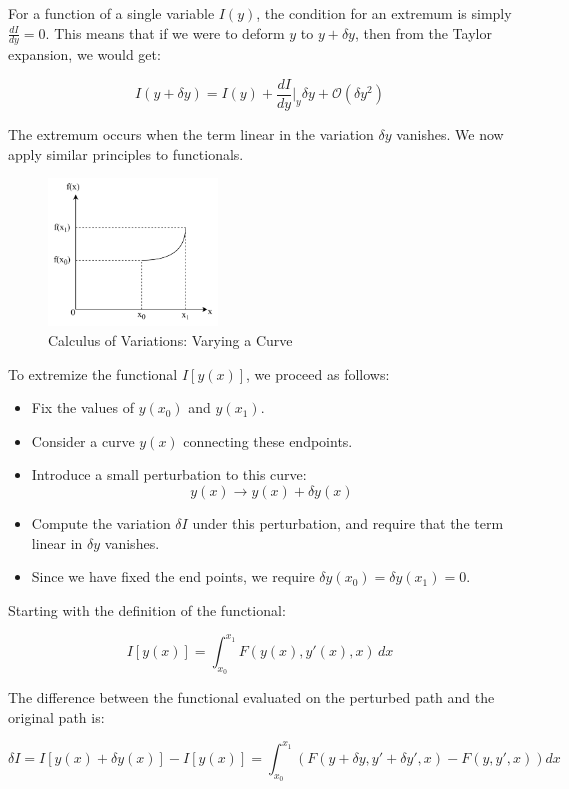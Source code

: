 For a function of a single variable $I(y)$, the condition for an extremum is simply 
$\frac{dI}{dy} = 0$. This means that if we were to deform $y$ to $y + \delta y$, then 
from the Taylor expansion, we would get:

\[
    I(y + \delta y) = I(y) + \frac{dI}{dy}\bigg|_y \delta y + \mathcal{O}(\delta y^2)
\]

The extremum occurs when the term linear in the variation $\delta y$ vanishes. We now 
apply similar principles to functionals.

\begin{figure}[ht]
    \centering
    \includegraphics[width=0.4\textwidth]{images/3-1-1.png}
    \caption{Calculus of Variations: Varying a Curve}
    \label{fig:3-1-1}
\end{figure}

To extremize the functional $I[y(x)]$, we proceed as follows:

\begin{itemize}
    \item Fix the values of $y(x_0)$ and $y(x_1)$.
    \item Consider a curve $y(x)$ connecting these endpoints.
    \item Introduce a small perturbation to this curve:
    \[
        y(x) \rightarrow y(x) + \delta y(x)
    \]
    \item Compute the variation $\delta I$ under this perturbation, and require that the
    term linear in $\delta y$ vanishes.
    \item Since we have fixed the end points, we require $\delta y(x_0) = \delta y(x_1) = 0$.
\end{itemize}

Starting with the definition of the functional:

\[
    I[y(x)] = \int_{x_0}^{x_1} F(y(x), y'(x), x) \, dx
\]

The difference between the functional evaluated on the perturbed path and the original 
path is:

\[
    \delta I = I[y(x) + \delta y(x)] - I[y(x)] = \int_{x_0}^{x_1} \left( F(y + \delta y, y' + \delta y', x) - F(y, y', x) \right) dx
\]


